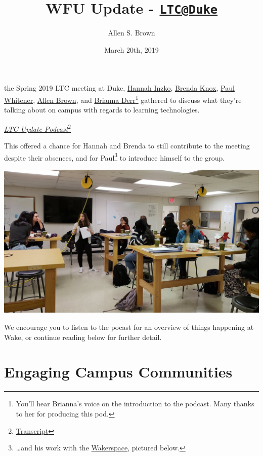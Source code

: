 \documentclass[]{tufte-handout}
\title{WFU Update - \href{mailto:LTC@Duke}{\nolinkurl{LTC@Duke}}}
\author{Allen S. Brown}
\date{March 20th, 2019}
\begin{document}
\maketitle




 the Spring 2019 LTC meeting at Duke,
\href{https://is.wfu.edu/academic-technologies/about/}{Hannah Inzko},
\href{https://oe.wfu.edu/about/}{Brenda Knox},
\href{https://is.wfu.edu/academic-technologies/whats-news/wakerspace/}{Paul
Whitener}, \href{https://oe.wfu.edu/about/}{Allen Brown}, and
\href{https://is.wfu.edu/academic-technologies/about/}{Brianna
Derr}\footnote{You'll hear Brianna's voice on the introduction to the
  podcast. Many thanks to her for producing this pod.} gathered to
discuss what they're talking about on campus with regards to learning
technologies.

\emph{\href{https://prod.wp.cdn.aws.wfu.edu/sites/232/2019/03/LTC_update_pod.mp3}{LTC
Update Podcast}}\footnote{\href{https://prod.wp.cdn.aws.wfu.edu/sites/232/2019/03/LTC-Update-Pod-Edited.pdf}{Transcript}}

This offered a chance for Hannah and Brenda to still contribute to the
meeting despite their absences, and for Paul\footnote{\ldots{}and his
  work with the \href{https://twitter.com/WakerSpace}{Wakerspace},
  pictured below.} to introduce himself to the group.

\begin{marginfigure}
\includegraphics{images/wakerspace} \end{marginfigure}

We encourage you to listen to the pocast for an overview of things
happening at Wake, or continue reading below for further detail.

\section{Engaging Campus Communities}\label{engaging-campus-communities}
\end{document}
